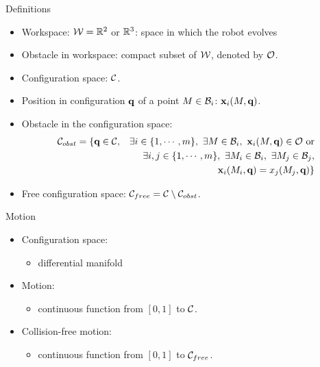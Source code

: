 \begin{frame} {Definitions}

\begin{itemize}
\item Workspace: ${\cal W}=\mathbb{R}^2$ or $\mathbb{R}^3$: space in which the robot evolves
\pause
\item Obstacle in workspace: compact subset of ${\cal W}$, denoted by ${\cal O}$.
\pause
\item Configuration space: ${\cal C}$.
\pause
\item Position in configuration $\textbf{q}$ of a point $M\in{\cal B}_i$:
  $\textbf{x}_i(M,\textbf{q})$.
\pause
\item Obstacle in the configuration space:
\begin{eqnarray*}
{\cal C}_{obst}&=\{\textbf{q}\in{\cal C},&\exists i\in\{1,\cdots,m\},\ \exists M\in{\cal B}_i,\ \textbf{x}_i(M,\textbf{q})\in{\cal O}\ \mbox{or}\\
&&\exists i,j\in\{1,\cdots,m\},\ \exists M_i\in{\cal B}_i,\ \exists M_j\in{\cal B}_j,\\
&&\textbf{x}_i(M_i,\textbf{q})=x_j(M_j,\textbf{q})\}
\end{eqnarray*}
\pause
\item Free configuration space: ${\cal C}_{free} = {\cal C}\setminus{\cal C}_{obst}$.
\end{itemize}
\end{frame}

%
%

\begin{frame} {Motion}

\begin{itemize}
\item Configuration space:
  \begin{itemize}
  \item differential manifold
  \end{itemize}
  \pause
\item Motion:
  \begin{itemize}
  \item continuous function from $[0,1]$ to ${\cal C}$.
  \end{itemize}
  \pause
\item Collision-free motion:
  \begin{itemize}
  \item continuous function from $[0,1]$ to ${\cal C}_{free}$.
  \end{itemize}
\end{itemize}
\end{frame}
